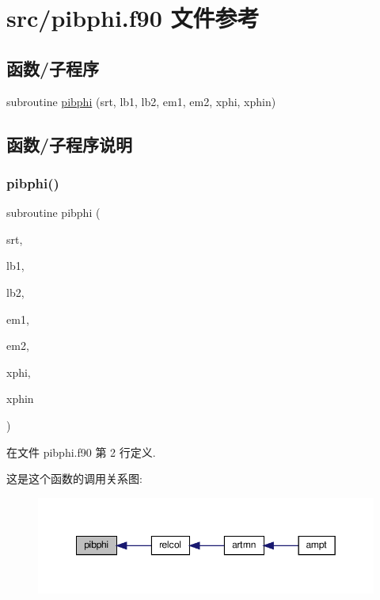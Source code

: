 \hypertarget{pibphi_8f90}{}\section{src/pibphi.f90 文件参考}
\label{pibphi_8f90}
\subsection*{函数/子程序}
\begin{DoxyCompactItemize}
\item 
subroutine \mbox{\hyperlink{pibphi_8f90_a6083e954f9cd3c9843d728c6d5f39d30}{pibphi}} (srt, lb1, lb2, em1, em2, xphi, xphin)
\end{DoxyCompactItemize}


\subsection{函数/子程序说明}
\mbox{\label{pibphi_8f90_a6083e954f9cd3c9843d728c6d5f39d30}} 
\subsubsection{\texorpdfstring{pibphi()}{pibphi()}}
{\footnotesize\ttfamily subroutine pibphi (\begin{DoxyParamCaption}\item[{}]{srt,  }\item[{}]{lb1,  }\item[{}]{lb2,  }\item[{}]{em1,  }\item[{}]{em2,  }\item[{}]{xphi,  }\item[{}]{xphin }\end{DoxyParamCaption})}



在文件 pibphi.\+f90 第 2 行定义.

这是这个函数的调用关系图\+:
\nopagebreak
\begin{figure}[H]
\begin{center}
\leavevmode
\includegraphics[width=349pt]{pibphi_8f90_a6083e954f9cd3c9843d728c6d5f39d30_icgraph}
\end{center}
\end{figure}
